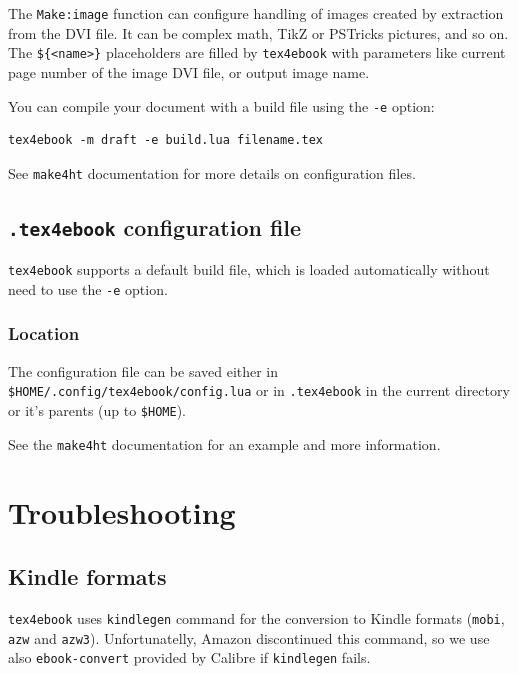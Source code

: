 The \texttt{Make:image} function can configure handling of images
created by extraction from the DVI file. It can be complex math, TikZ or
PSTricks pictures, and so on. The
\texttt{\$\{\textless{}name\textgreater{}\}} placeholders are filled by
\texttt{tex4ebook} with parameters like current page number of the image
DVI file, or output image name.

You can compile your document with a build file using the \texttt{-e}
option:

\begin{verbatim}
tex4ebook -m draft -e build.lua filename.tex
\end{verbatim}

See \texttt{make4ht} documentation for more details on configuration
files.

\subsection{\texorpdfstring{\texttt{.tex4ebook} configuration
file}{.tex4ebook configuration file}}\label{tex4ebook-configuration-file}

\texttt{tex4ebook} supports a default build file, which is loaded
automatically without need to use the \texttt{-e} option.

\subsubsection{Location}\label{location}

The configuration file can be saved either in
\texttt{\$HOME/.config/tex4ebook/config.lua} or in \texttt{.tex4ebook}
in the current directory or it's parents (up to \texttt{\$HOME}).

See the \texttt{make4ht} documentation for an example and more
information.

\section{Troubleshooting}\label{troubleshooting}

\subsection{Kindle formats}\label{kindle-formats}

\texttt{tex4ebook} uses \texttt{kindlegen} command for the conversion to
Kindle formats (\texttt{mobi}, \texttt{azw} and \texttt{azw3}).
Unfortunatelly, Amazon discontinued this command, so we use also
\texttt{ebook-convert} provided by Calibre if \texttt{kindlegen} fails.

